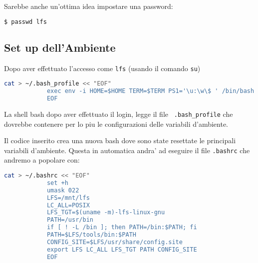 \documentclass{article}
\begin{document}
        Sarebbe anche un'ottima idea impostare una password:
        \begin{lstlisting}[language=bash]
            $ passwd lfs
        \end{lstlisting}
    \subsection{Set up dell'Ambiente}
        Dopo aver effettuato l'accesso come \texttt{lfs} (usando il comando \texttt{su})
        \begin{lstlisting}[language=bash]
            cat > ~/.bash_profile << "EOF"
            exec env -i HOME=$HOME TERM=$TERM PS1='\u:\w\$ ' /bin/bash
            EOF
        \end{lstlisting}

        La shell bash dopo aver effettuato il login, legge il file \texttt{ .bash_profile} che dovrebbe contenere
        per lo piu le configurazioni delle variabili d'ambiente.

        Il codice inserito crea una nuova bash dove sono state resettate le principali variabili d'ambiente. 
        Questa in automatica andra' ad eseguire il file \texttt{.bashrc} che andremo a popolare con:

        \begin{lstlisting}[language=bash]
            cat > ~/.bashrc << "EOF"
            set +h
            umask 022
            LFS=/mnt/lfs
            LC_ALL=POSIX
            LFS_TGT=$(uname -m)-lfs-linux-gnu
            PATH=/usr/bin
            if [ ! -L /bin ]; then PATH=/bin:$PATH; fi
            PATH=$LFS/tools/bin:$PATH
            CONFIG_SITE=$LFS/usr/share/config.site
            export LFS LC_ALL LFS_TGT PATH CONFIG_SITE
            EOF
        \end{lstlisting}
\end{document}
